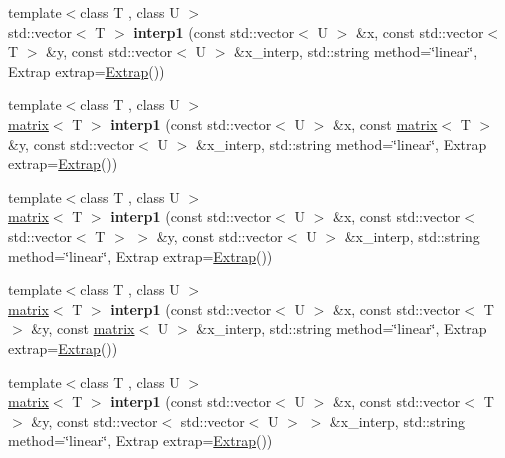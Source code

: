 \begin{DoxyCompactItemize}
\item 
\hypertarget{namespacekeycpp_afe6759a7b418424b2ff906479f7be674}{{\footnotesize template$<$class T , class U $>$ }\\std\-::vector$<$ T $>$ {\bfseries interp1} (const std\-::vector$<$ U $>$ \&x, const std\-::vector$<$ T $>$ \&y, const std\-::vector$<$ U $>$ \&x\-\_\-interp, std\-::string method=\char`\"{}linear\char`\"{}, Extrap extrap=\hyperlink{classkeycpp_1_1_extrap}{Extrap}())}\label{namespacekeycpp_afe6759a7b418424b2ff906479f7be674}

\item 
\hypertarget{namespacekeycpp_a4a49bf5b82e6ed936de7431edf4a80b1}{{\footnotesize template$<$class T , class U $>$ }\\\hyperlink{classkeycpp_1_1matrix}{matrix}$<$ T $>$ {\bfseries interp1} (const std\-::vector$<$ U $>$ \&x, const \hyperlink{classkeycpp_1_1matrix}{matrix}$<$ T $>$ \&y, const std\-::vector$<$ U $>$ \&x\-\_\-interp, std\-::string method=\char`\"{}linear\char`\"{}, Extrap extrap=\hyperlink{classkeycpp_1_1_extrap}{Extrap}())}\label{namespacekeycpp_a4a49bf5b82e6ed936de7431edf4a80b1}

\item 
\hypertarget{namespacekeycpp_aaf4e4d72785a2ab1f2a5f351789d904f}{{\footnotesize template$<$class T , class U $>$ }\\\hyperlink{classkeycpp_1_1matrix}{matrix}$<$ T $>$ {\bfseries interp1} (const std\-::vector$<$ U $>$ \&x, const std\-::vector$<$ std\-::vector$<$ T $>$ $>$ \&y, const std\-::vector$<$ U $>$ \&x\-\_\-interp, std\-::string method=\char`\"{}linear\char`\"{}, Extrap extrap=\hyperlink{classkeycpp_1_1_extrap}{Extrap}())}\label{namespacekeycpp_aaf4e4d72785a2ab1f2a5f351789d904f}

\item 
\hypertarget{namespacekeycpp_a0c7738d1b0ccad83715f29398829bd78}{{\footnotesize template$<$class T , class U $>$ }\\\hyperlink{classkeycpp_1_1matrix}{matrix}$<$ T $>$ {\bfseries interp1} (const std\-::vector$<$ U $>$ \&x, const std\-::vector$<$ T $>$ \&y, const \hyperlink{classkeycpp_1_1matrix}{matrix}$<$ U $>$ \&x\-\_\-interp, std\-::string method=\char`\"{}linear\char`\"{}, Extrap extrap=\hyperlink{classkeycpp_1_1_extrap}{Extrap}())}\label{namespacekeycpp_a0c7738d1b0ccad83715f29398829bd78}

\item 
\hypertarget{namespacekeycpp_a5505a093e19a1f347d347b4a27ca7799}{{\footnotesize template$<$class T , class U $>$ }\\\hyperlink{classkeycpp_1_1matrix}{matrix}$<$ T $>$ {\bfseries interp1} (const std\-::vector$<$ U $>$ \&x, const std\-::vector$<$ T $>$ \&y, const std\-::vector$<$ std\-::vector$<$ U $>$ $>$ \&x\-\_\-interp, std\-::string method=\char`\"{}linear\char`\"{}, Extrap extrap=\hyperlink{classkeycpp_1_1_extrap}{Extrap}())}\label{namespacekeycpp_a5505a093e19a1f347d347b4a27ca7799}


\end{DoxyCompactItemize}
